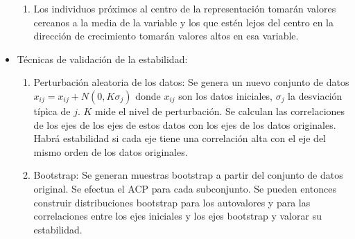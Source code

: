 \begin{itemize}
\begin{enumerate}
              \item Los individuos próximos al centro de la representación tomarán valores cercanos a la media de la variable y los que estén lejos del centro en la dirección de crecimiento tomarán valores altos en esa variable.
          \end{enumerate}
    \item Técnicas de validación de la estabilidad:
          \begin{enumerate}
              \item Perturbación aleatoria de los datos: Se genera un nuevo conjunto de datos $x_{ij}=x_{ij}+N(0,K\sigma_j)$ donde $x_{ij}$ son los datos iniciales, $\sigma_j$ la desviación típìca de $j$. $K$ mide el nivel de perturbación. Se calculan las correlaciones de los ejes de los ejes de estos datos con los ejes de los datos originales. Habrá estabilidad si cada eje tiene una correlación alta con el eje del mismo orden de los datos originales.
              \item  Bootstrap: Se generan muestras bootstrap a partir del conjunto de datos original. Se efectua el ACP para cada subconjunto. Se pueden entonces construir distribuciones bootstrap para los autovalores y para las correlaciones entre los ejes iniciales y los ejes bootstrap y valorar su estabilidad.
          \end{enumerate}
\end{itemize}
